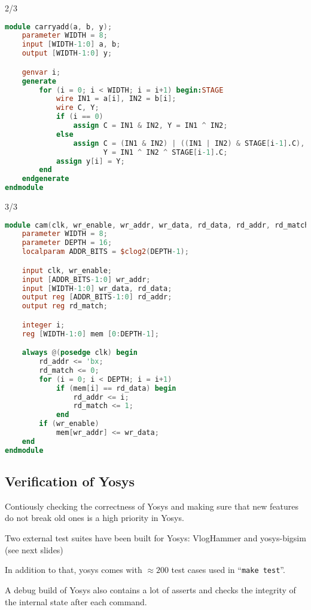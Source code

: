 \begin{frame}[fragile]{\subsecname{} 2/3}
\begin{lstlisting}[xleftmargin=1cm, basicstyle=\ttfamily\fontsize{8pt}{10pt}\selectfont, language=Verilog]
module carryadd(a, b, y);
    parameter WIDTH = 8;
    input [WIDTH-1:0] a, b;
    output [WIDTH-1:0] y;

    genvar i;
    generate
        for (i = 0; i < WIDTH; i = i+1) begin:STAGE
            wire IN1 = a[i], IN2 = b[i];
            wire C, Y;
            if (i == 0)
                assign C = IN1 & IN2, Y = IN1 ^ IN2;
            else
                assign C = (IN1 & IN2) | ((IN1 | IN2) & STAGE[i-1].C),
                       Y = IN1 ^ IN2 ^ STAGE[i-1].C;
            assign y[i] = Y;
        end
    endgenerate
endmodule
\end{lstlisting}
\end{frame}

\begin{frame}[fragile]{\subsecname{} 3/3}
\begin{lstlisting}[xleftmargin=1cm, basicstyle=\ttfamily\fontsize{7pt}{8.5pt}\selectfont, language=Verilog]
module cam(clk, wr_enable, wr_addr, wr_data, rd_data, rd_addr, rd_match);
    parameter WIDTH = 8;
    parameter DEPTH = 16;
    localparam ADDR_BITS = $clog2(DEPTH-1);

    input clk, wr_enable;
    input [ADDR_BITS-1:0] wr_addr;
    input [WIDTH-1:0] wr_data, rd_data;
    output reg [ADDR_BITS-1:0] rd_addr;
    output reg rd_match;

    integer i;
    reg [WIDTH-1:0] mem [0:DEPTH-1];

    always @(posedge clk) begin
        rd_addr <= 'bx;
        rd_match <= 0;
        for (i = 0; i < DEPTH; i = i+1)
            if (mem[i] == rd_data) begin
                rd_addr <= i;
                rd_match <= 1;
            end
        if (wr_enable)
            mem[wr_addr] <= wr_data;
    end
endmodule
\end{lstlisting}
\end{frame}


\subsection{Verification of Yosys}

\begin{frame}{\subsecname}
Contiously checking the correctness of Yosys and making sure that new features
do not break old ones is a high priority in Yosys.

\bigskip
Two external test suites have been built for Yosys: VlogHammer and yosys-bigsim
(see next slides)

\bigskip
In addition to that, yosys comes with $\approx\!200$ test cases used in ``{\tt make test}''.

\bigskip
A debug build of Yosys also contains a lot of asserts and checks the integrity of
the internal state after each command.
\end{frame}

